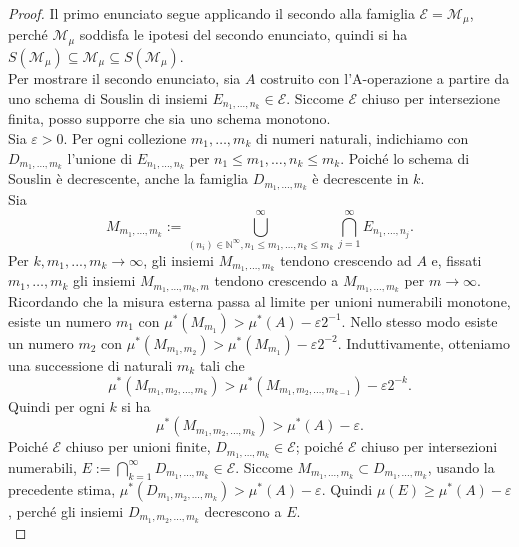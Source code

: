 \documentclass[a4paper, twoside,openright]{article}
\newcommand{\<}{\langle}
\renewcommand{\>}{\rangle}
\begin{document}
\begin{proof}
	Il primo enunciato segue applicando il secondo alla famiglia $\mathcal{E}=\mathcal{M}_{\mu}$, perché $\mathcal{M}_{\mu}$ soddisfa le ipotesi del secondo enunciato, quindi si ha $S(\mathcal{M}_{\mu}) \subseteq \mathcal{M}_{\mu} \subseteq S(\mathcal{M}_{\mu})$.\\
	Per mostrare il secondo enunciato, sia $A$ costruito con l'A-operazione a partire da uno schema di Souslin di insiemi $E_{n_{1}, \ldots, n_{k}} \in \mathcal{E}$. Siccome $\mathcal{E}$ chiuso per intersezione finita, posso supporre che sia uno schema monotono.\\
	Sia $\varepsilon>0$. Per ogni collezione $m_{1}, \ldots, m_{k}$ di numeri naturali, indichiamo con $D_{m_{1}, \ldots, m_{k}}$ l'unione di $E_{n_{1}, \ldots, n_{k}}$ per $n_{1} \leq m_{1}, \ldots, n_{k} \leq m_{k}$. Poiché lo schema di Souslin è decrescente, anche la famiglia $D_{m_1,...,m_k}$ è decrescente in $k$.\\
	Sia
	$$
	M_{m_{1}, \ldots, m_{k}}:=\bigcup_{\left(n_{i}\right) \in \mathbb{N}^{\infty}, n_{1} \leq m_{1}, \ldots, n_{k} \leq m_{k}}^{\infty} \bigcap_{j=1}^{\infty} E_{n_{1}, \ldots, n_{j}} .
	$$
	Per $k, m_1,...,m_k \rightarrow \infty$, gli insiemi $M_{m_1,...,m_k}$ tendono crescendo ad $A$ e, fissati $m_{1}, \ldots, m_{k}$ gli insiemi $M_{m_{1}, \ldots, m_{k}, m}$  tendono crescendo a $M_{m_{1}, \ldots, m_{k}}$ per $m \rightarrow \infty$.\\
	Ricordando che la misura esterna passa al limite per unioni numerabili monotone, esiste un numero $m_{1}$ con $\mu^{*}\left(M_{m_{1}}\right)>\mu^{*}(A)-\varepsilon 2^{-1}$. Nello stesso modo esiste un numero $m_{2}$ con $\mu^{*}\left(M_{m_{1}, m_{2}}\right)>\mu^{*}\left(M_{m_{1}}\right)-\varepsilon 2^{-2}$. Induttivamente, otteniamo una successione di naturali $m_{k}$ tali che
	$$
	\mu^{*}\left(M_{m_{1}, m_{2}, \ldots, m_{k}}\right)>\mu^{*}\left(M_{m_{1}, m_{2}, \ldots, m_{k-1}}\right)-\varepsilon 2^{-k} .
	$$
	Quindi per ogni $k$ si ha
	$$
	\mu^{*}\left(M_{m_{1}, m_{2}, \ldots, m_{k}}\right)>\mu^{*}(A)-\varepsilon .
	$$
	Poiché $\mathcal{E}$ chiuso per unioni finite, $D_{m_{1}, \ldots, m_{k}} \in \mathcal{E}$; poiché $\mathcal{E}$ chiuso per intersezioni numerabili, $E:=\bigcap_{k=1}^{\infty} D_{m_{1}, \ldots, m_{k}} \in \mathcal{E}$. Siccome $M_{m_{1}, \ldots, m_{k}} \subset D_{m_{1}, \ldots, m_{k}}$, usando la precedente stima, $\mu^{*}\left(D_{m_{1}, m_{2}, \ldots, m_{k}}\right)>\mu^{*}(A)-\varepsilon$. Quindi $\mu(E) \geq \mu^{*}(A)-\varepsilon$, perché gli insiemi $D_{m_{1}, m_{2}, \ldots, m_{k}}$ decrescono a $E$.\\

\end{proof}
\end{document}
